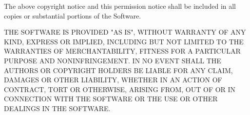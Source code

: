 The above copyright notice and this permission notice shall be included in all copies or substantial portions of the Software.

THE SOFTWARE IS PROVIDED "{}\+AS IS"{}, WITHOUT WARRANTY OF ANY KIND, EXPRESS OR IMPLIED, INCLUDING BUT NOT LIMITED TO THE WARRANTIES OF MERCHANTABILITY, FITNESS FOR A PARTICULAR PURPOSE AND NONINFRINGEMENT. IN NO EVENT SHALL THE AUTHORS OR COPYRIGHT HOLDERS BE LIABLE FOR ANY CLAIM, DAMAGES OR OTHER LIABILITY, WHETHER IN AN ACTION OF CONTRACT, TORT OR OTHERWISE, ARISING FROM, OUT OF OR IN CONNECTION WITH THE SOFTWARE OR THE USE OR OTHER DEALINGS IN THE SOFTWARE. 